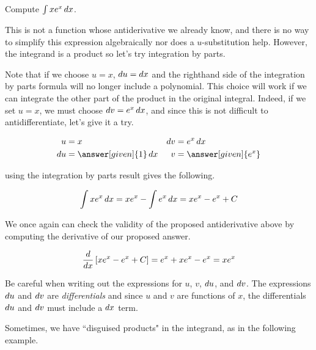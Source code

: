 \documentclass[noauthor]{ximera}
\begin{document}
\begin{example}
Compute $\int xe^{x} \mathop{}\!d x$.

\begin{explanation}
This is not a function whose antiderivative we already know, and there is no way to simplify this expression algebraically nor does a $u$-substitution help.  However, the integrand is a product so let's try integration by parts.  

Note that if we choose $u=x$, $\mathop{}\!d u = \mathop{}\!d x$ and the righthand side of the integration by parts formula will no longer include a polynomial.  This choice will work if we can integrate the other part of the product in the original integral.  Indeed, if we set $u=x$, we must choose $\mathop{}\!d v=e^{x} \mathop{}\!d x$, and since this is not difficult to antidifferentiate, let's give it a try.

\begin{align*}
u &= x & \d v & = e^x \d x \\
 \d u &= \answer[given]{1} \d x & v&= \answer[given]{e^x}
\end{align*}

using the integration by parts result gives the following.

\[
\int xe^{x} \mathop{}\!d x= xe^{x}-\int e^{x} \mathop{}\!d x=xe^{x}-e^{x} + C
\]

\end{explanation}

We once again can check the validity of the proposed antiderivative above by computing the derivative of our proposed answer.

\[
\frac{d}{\mathop{}\!d x} \left[xe^{x}-e^{x} + C\right] = e^x+xe^x -e^x = xe^x
\]

\end{example}

\begin{warning}
Be careful when writing out the expressions for $u$, $v$, $\mathop{}\!d u$, and $\mathop{}\!d v$.  The expressions $\mathop{}\!d u$ and $\mathop{}\!d v$ are \emph{differentials} and since $u$ and $v$ are functions of $x$, the differentials $\mathop{}\!d u$ and $\mathop{}\!d v$ must include a $\mathop{}\!d x$ term.
\end{warning}

Sometimes, we have ``disguised products" in the integrand, as in the following example.
\end{document}
